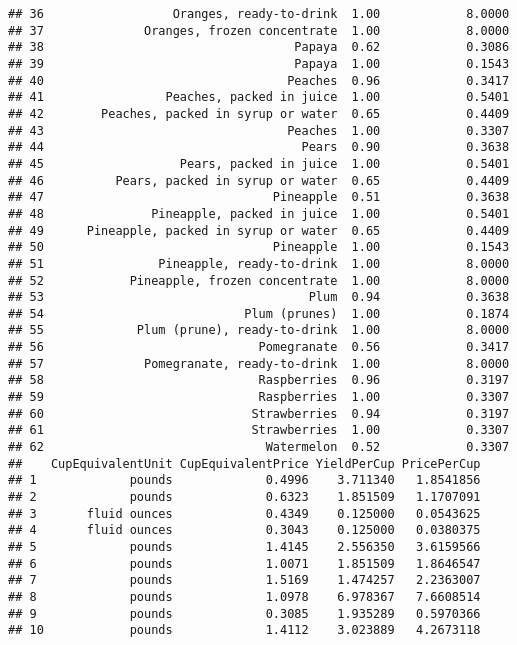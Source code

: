 \documentclass[
]{article}
\begin{document}
\begin{verbatim}
## 36                  Oranges, ready-to-drink  1.00            8.0000
## 37              Oranges, frozen concentrate  1.00            8.0000
## 38                                   Papaya  0.62            0.3086
## 39                                   Papaya  1.00            0.1543
## 40                                  Peaches  0.96            0.3417
## 41                 Peaches, packed in juice  1.00            0.5401
## 42        Peaches, packed in syrup or water  0.65            0.4409
## 43                                  Peaches  1.00            0.3307
## 44                                    Pears  0.90            0.3638
## 45                   Pears, packed in juice  1.00            0.5401
## 46          Pears, packed in syrup or water  0.65            0.4409
## 47                                Pineapple  0.51            0.3638
## 48               Pineapple, packed in juice  1.00            0.5401
## 49      Pineapple, packed in syrup or water  0.65            0.4409
## 50                                Pineapple  1.00            0.1543
## 51                Pineapple, ready-to-drink  1.00            8.0000
## 52            Pineapple, frozen concentrate  1.00            8.0000
## 53                                     Plum  0.94            0.3638
## 54                            Plum (prunes)  1.00            0.1874
## 55             Plum (prune), ready-to-drink  1.00            8.0000
## 56                              Pomegranate  0.56            0.3417
## 57              Pomegranate, ready-to-drink  1.00            8.0000
## 58                              Raspberries  0.96            0.3197
## 59                              Raspberries  1.00            0.3307
## 60                             Strawberries  0.94            0.3197
## 61                             Strawberries  1.00            0.3307
## 62                               Watermelon  0.52            0.3307
##    CupEquivalentUnit CupEquivalentPrice YieldPerCup PricePerCup
## 1             pounds             0.4996    3.711340   1.8541856
## 2             pounds             0.6323    1.851509   1.1707091
## 3       fluid ounces             0.4349    0.125000   0.0543625
## 4       fluid ounces             0.3043    0.125000   0.0380375
## 5             pounds             1.4145    2.556350   3.6159566
## 6             pounds             1.0071    1.851509   1.8646547
## 7             pounds             1.5169    1.474257   2.2363007
## 8             pounds             1.0978    6.978367   7.6608514
## 9             pounds             0.3085    1.935289   0.5970366
## 10            pounds             1.4112    3.023889   4.2673118

\end{verbatim}
\end{document}
